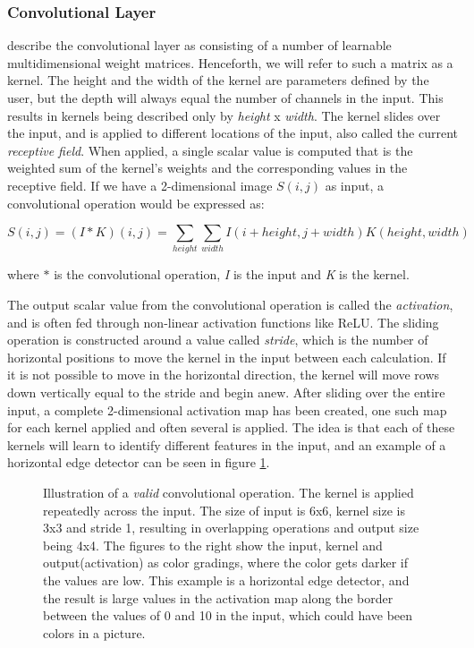     \subsubsection{Convolutional Layer}
     \citeauthor{o2015introduction_convolutions}\cite{o2015introduction_convolutions} describe the convolutional layer as consisting of a number of learnable multidimensional weight matrices. Henceforth, we will refer to such a matrix as a kernel. The height and the width of the kernel are parameters defined by the user, but the depth will always equal the number of channels in the input. This results in kernels being described only by \textit{height} x \textit{width}. The kernel slides over the input, and is applied to different locations of the input, also called the current \textit{receptive field}. When applied, a single scalar value is computed that is the weighted sum of the kernel's weights and the corresponding values in the receptive field. If we have a 2-dimensional image $S(i,j)$ as input, a convolutional operation would be expressed as\cite{Goodfellow-et-al-2016_convolution}:
     
        \begin{equation}
            S(i,j) = (I*K)(i,j) = \sum_{height}\sum_{width}I(i+height,j+width)K(height,width)
        \end{equation}
     
     where $*$ is the convolutional operation, \textit{I} is the input and \textit{K} is the kernel.
     
     The output scalar value from the convolutional operation is called the \textit{activation}, and is often fed through non-linear activation functions like ReLU\cite{o2015introduction_convolutions}. The sliding operation is constructed around a value called \textit{stride}, which is the number of horizontal positions to move the kernel in the input between each calculation. If it is not possible to move in the horizontal direction, the kernel will move rows down vertically equal to the stride and begin anew. After sliding over the entire input, a complete 2-dimensional activation map has been created, one such map for each kernel applied and often several is applied. The idea is that each of these kernels will learn to identify different features in the input, and an example of a horizontal edge detector can be seen in figure \ref{convolutional_fig}. 
    \begin{figure}[H]
        \centering
                
        \caption[Horizontal edge detector example]{Illustration of a \textit{valid} convolutional operation. The kernel is applied repeatedly across the input. The size of input is 6x6, kernel size is 3x3 and stride 1, resulting in overlapping operations and output size being 4x4. The figures to the right show the input, kernel and output(activation) as color gradings, where the color gets darker if the values are low. This example is a horizontal edge detector, and the result is large values in the activation map along the border between the values of 0 and 10 in the input, which could have been colors in a picture.}
      	\medskip 
        \label{convolutional_fig}
    \end{figure}
    
